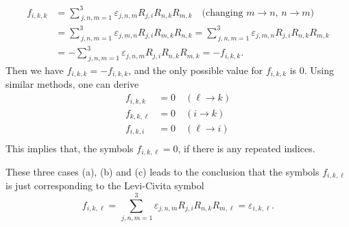 \documentclass[12pt]{article}
\begin{document}
\begin{itemize}
\begin{align}
f_{i,k,k} 
&= \sum_{\,j,n,m=1}^{3}\varepsilon_{j,n,m} R_{j,i} R_{n,k} R_{m,k}
\quad\text{(changing $m\to n$, $n\to m$)}\\
&= \sum_{\,j,n,m=1}^{3}\varepsilon_{j,m,n} R_{j,i} R_{m,k} R_{n,k} 
= \sum_{\,j,n,m=1}^{3}\varepsilon_{j,m,n} R_{j,i} R_{n,k} R_{m,k}\\
&= -\sum_{\,j,n,m=1}^{3}\varepsilon_{j,n,m} R_{j,i} R_{n,k} R_{m,k} = - f_{i,k,k}.
\end{align}
Then we have $f_{i,k,k} = - f_{i,k,k}$, and the only possible value for $f_{i,k,k}$ is $0$. Using similar methods, one can derive
\begin{equation}
\begin{aligned}
f_{i,k,k} &= 0 	\quad (\ell \to k)\\
f_{k,k,\ell} &= 0\quad (i\to k)\\
f_{i,k,i} &= 0	\quad (\ell \to i)\\
\end{aligned}
\end{equation}
This implies that, the symbols $f_{i,k,\ell}=0$, if there is any repeated indices.
\end{itemize}
These three cases (a), (b) and (c) leads to the conclusion that the symbols $f_{i,k,\ell}$ is just corresponding to the Levi-Civita symbol 
\begin{equation}
f_{i,k,\ell} = \sum_{\,j,n,m=1}^{3}\varepsilon_{j,n,m} R_{j,i} R_{n,k} R_{m,\ell} = \varepsilon_{i,k,\ell}.
\end{equation} 




\end{document}
